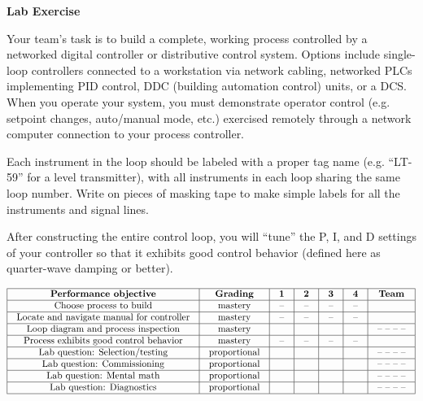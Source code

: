 

\noindent
{\bf Lab Exercise}

\vskip 5pt

Your team's task is to build a complete, working process controlled by a networked digital controller or distributive control system.  Options include single-loop controllers connected to a workstation via network cabling, networked PLCs implementing PID control, DDC (building automation control) units, or a DCS.  When you operate your system, you must demonstrate operator control (e.g. setpoint changes, auto/manual mode, etc.) exercised remotely through a network computer connection to your process controller.

Each instrument in the loop should be labeled with a proper tag name (e.g. ``LT-59'' for a level transmitter), with all instruments in each loop sharing the same loop number.  Write on pieces of masking tape to make simple labels for all the instruments and signal lines.

After constructing the entire control loop, you will ``tune'' the P, I, and D settings of your controller so that it exhibits good control behavior (defined here as quarter-wave damping or better).

\vskip 10pt



$$\vbox{\offinterlineskip
\halign{\strut
\vrule \quad\hfil # \ \hfil & 
\vrule \quad\hfil # \ \hfil & 
\vrule \quad\hfil # \ \hfil & 
\vrule \quad\hfil # \ \hfil & 
\vrule \quad\hfil # \ \hfil & 
\vrule \quad\hfil # \ \hfil & 
\vrule \quad\hfil # \ \hfil \vrule \cr
\noalign{\hrule}
%
{\bf Performance objective} & {\bf Grading} & {\bf 1} & {\bf 2} & {\bf 3} & {\bf 4} & {\bf Team} \cr
%
\noalign{\hrule}
%
Choose process to build & mastery & -- & -- & -- & -- & \cr
%
\noalign{\hrule}
%
Locate and navigate manual for controller & mastery & -- & -- & -- & -- & \cr
%
\noalign{\hrule}
%
Loop diagram and process inspection & mastery & & & & & -- -- -- -- \cr
%
\noalign{\hrule}
%
Process exhibits good control behavior & mastery & -- & -- & -- & -- &  \cr
%
\noalign{\hrule}
%
Lab question: Selection/testing & proportional &  &  &  &  & -- -- -- -- \cr
%
\noalign{\hrule}
%
Lab question: Commissioning & proportional &  &  &  &  & -- -- -- -- \cr
%
\noalign{\hrule}
%
Lab question: Mental math & proportional &  &  &  &  & -- -- -- -- \cr
%
\noalign{\hrule}
%
Lab question: Diagnostics & proportional &  &  &  &  & -- -- -- -- \cr
%
\noalign{\hrule}
} %
}$$ %

